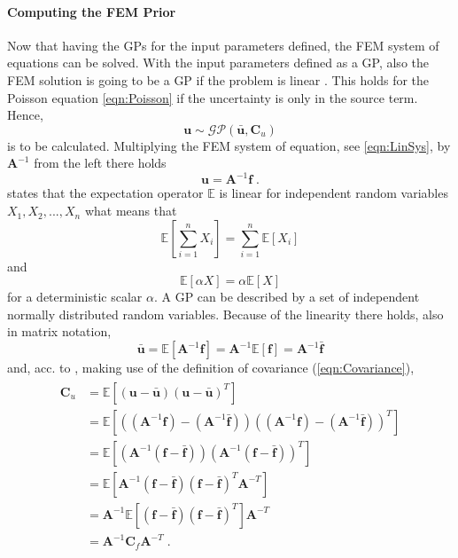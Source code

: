 \documentclass[%
  a4paper,oneside,%
  11pt,%
  smallchapters,
  style=printdev,
  extramargin,
  green,%
  rgb, <cmyk>
  ]{tubsbook}
\begin{document}
\paragraph{Computing the FEM Prior}
Now that having the GPs for the input parameters defined, the FEM system of equations can be solved. With the input parameters defined as a GP, also the FEM solution is going to be a GP if the problem is linear \cite[p. 5]{girolami2021}. This holds for the Poisson equation \eqref{eqn:Poisson} if the uncertainty is only in the source term. Hence,
\begin{equation}
\bm{u} \sim \mathcal{GP}(\bar{\bm{u}}, \bm{C}_u)
\label{eqn:SolutionGP}
\end{equation}
is to be calculated. Multiplying the FEM system of equation, see \eqref{eqn:LinSys}, by $\bm{A}^{-1}$ from the left there holds
\begin{equation}
\bm{u} = \bm{A}^{-1}\bm{f} \;.
\end{equation}
\cite[p. 1428]{arens2015} states that the expectation operator $\mathbb{E}$ is linear for independent random variables $X_1,X_2,...,X_n$ what means that
\begin{equation}
\mathbb{E}\left[  \sum_{i=1}^n X_i \right] = \sum_{i=1}^n \mathbb{E}[X_i] 
\end{equation}
and
\begin{equation}
\mathbb{E}\left[ \alpha X   \right] =\alpha \mathbb{E}\left[  X   \right]
\end{equation}
for a deterministic scalar $\alpha$.
A GP can be described by a set of independent normally distributed random variables. Because of the linearity there holds, also in matrix notation,
\begin{equation}
\bar{\bm{u}} = \mathbb{E}[\bm{A}^{-1} \bm{f}] = \bm{A}^{-1} \mathbb{E}[\bm{f}] = \bm{A}^{-1} \bar{\bm{f}}
\end{equation}
and, acc. to \cite{schon2011, bardsley2018}, making use of the definition of covariance (\ref{eqn:Covariance}),
\begin{align}
\begin{split}
\bm{C}_u &= \mathbb{E}[(\bm{u}-\bar{\bm{u}})(\bm{u}-\bar{\bm{u}})^T] \\
	&= \mathbb{E}\left[\left((\bm{A}^{-1} \bm{f}) - (\bm{A}^{-1} \bar{\bm{f}}) \right) \left( (\bm{A}^{-1} \bm{f}) - (\bm{A}^{-1} \bar{\bm{f}}) \right)^T   \right]\\
	&= \mathbb{E}\left[  \left( \bm{A}^{-1}(\bm{f}-\bar{\bm{f}})   \right)  \left( \bm{A}^{-1}(\bm{f}-\bar{\bm{f}})   \right)^T  \right]\\
	&= \mathbb{E} \left[    \bm{A}^{-1} ( \bm{f} - \bar{\bm{f}} ) ( \bm{f} - \bar{\bm{f}} )^T \bm{A}^{-T}   \right]\\
	&= \bm{A}^{-1}   \mathbb{E}\left[ (\bm{f}-\bar{\bm{f}}) (\bm{f}-\bar{\bm{f}})^T   \right] \bm{A}^{-T} \\
	&= \bm{A}^{-1} \bm{C}_f \bm{A}^{-T}  \;.
\end{split}
\label{eqn:Covarf}
\end{align}
\end{document}
